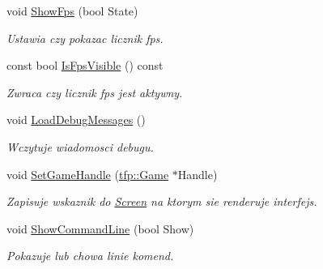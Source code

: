 \begin{DoxyCompactItemize}
void \mbox{\hyperlink{classtfp_1_1_interface_a9b7921e5ac2e273ad9d74d7978e67cdd}{Show\+Fps}} (bool State)
\begin{DoxyCompactList}\small\item\em Ustawia czy pokazac licznik fps. \end{DoxyCompactList}\item 
\mbox{\label{classtfp_1_1_interface_a262922eb14f99531f25257147952b3a9}} 
const bool \mbox{\hyperlink{classtfp_1_1_interface_a262922eb14f99531f25257147952b3a9}{Is\+Fps\+Visible}} () const
\begin{DoxyCompactList}\small\item\em Zwraca czy licznik fps jest aktywny. \end{DoxyCompactList}\item 
\mbox{\label{classtfp_1_1_interface_aaf7310297cd0484a321433d399578b1b}} 
void \mbox{\hyperlink{classtfp_1_1_interface_aaf7310297cd0484a321433d399578b1b}{Load\+Debug\+Messages}} ()
\begin{DoxyCompactList}\small\item\em Wczytuje wiadomosci debugu. \end{DoxyCompactList}\item 
\mbox{\label{classtfp_1_1_interface_a29475dfcc2b3a565c7b8242633616f43}} 
void \mbox{\hyperlink{classtfp_1_1_interface_a29475dfcc2b3a565c7b8242633616f43}{Set\+Game\+Handle}} (\mbox{\hyperlink{classtfp_1_1_game}{tfp\+::\+Game}} $\ast$Handle)
\begin{DoxyCompactList}\small\item\em Zapisuje wskaznik do \mbox{\hyperlink{classtfp_1_1_screen}{Screen}} na ktorym sie renderuje interfejs. \end{DoxyCompactList}\item 
\mbox{\label{classtfp_1_1_interface_aa658dc89a9249109c8c2643c7d6e45ab}} 
void \mbox{\hyperlink{classtfp_1_1_interface_aa658dc89a9249109c8c2643c7d6e45ab}{Show\+Command\+Line}} (bool Show)
\begin{DoxyCompactList}\small\item\em Pokazuje lub chowa linie komend. \end{DoxyCompactList}\item 
\mbox{\label{classtfp_1_1_interface_aabf92504d2950f393a16e8adeb4919b7}} 

\end{DoxyCompactItemize}
